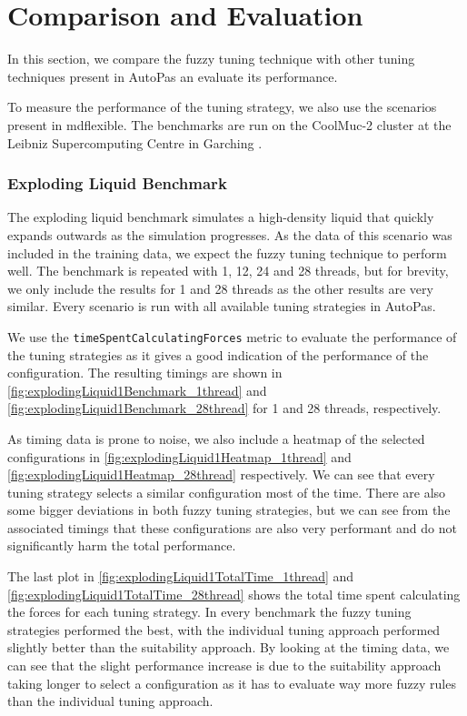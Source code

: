 \chapter{Comparison and Evaluation}
\label{sec:comparison_and_evaluation}

In this section, we compare the fuzzy tuning technique with other tuning techniques present in AutoPas an evaluate its performance.

To measure the performance of the tuning strategy, we also use the scenarios present in \gls{mdflexible}. The benchmarks are run on the CoolMuc-2 cluster at the Leibniz Supercomputing Centre in Garching .



\subsection{Exploding Liquid Benchmark}

The exploding liquid benchmark simulates a high-density liquid that quickly expands outwards as the simulation progresses. As the data of this scenario was included in the training data, we expect the fuzzy tuning technique to perform well. The benchmark is repeated with 1, 12, 24 and 28 threads, but for brevity, we only include the results for 1 and 28 threads as the other results are very similar. Every scenario is run with all available tuning strategies in AutoPas.

We use the \texttt{timeSpentCalculatingForces} metric to evaluate the performance of the tuning strategies as it gives a good indication of the performance of the configuration. The resulting timings are shown in \ref{fig:explodingLiquid1Benchmark_1thread} and \ref{fig:explodingLiquid1Benchmark_28thread} for 1 and 28 threads, respectively.

As timing data is prone to noise, we also include a heatmap of the selected configurations in \ref{fig:explodingLiquid1Heatmap_1thread} and \ref{fig:explodingLiquid1Heatmap_28thread} respectively. We can see that every tuning strategy selects a similar configuration most of the time. There are also some bigger deviations in both fuzzy tuning strategies, but we can see from the associated timings that these configurations are also very performant and do not significantly harm the total performance.

The last plot in \ref{fig:explodingLiquid1TotalTime_1thread} and \ref{fig:explodingLiquid1TotalTime_28thread} shows the total time spent calculating the forces for each tuning strategy. In every benchmark the fuzzy tuning strategies performed the best, with the individual tuning approach performed slightly better than the suitability approach. By looking at the timing data, we can see that the slight performance increase is due to the suitability approach taking longer to select a configuration as it has to evaluate way more fuzzy rules than the individual tuning approach.

